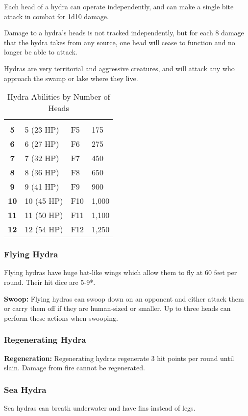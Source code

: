 \begin{multicols*}{2}
Each head of a hydra can operate independently, and can make a single bite attack in combat for 1d10 damage.

Damage to a hydra’s heads is not tracked independently, but for each 8 damage that the hydra takes from any source, one head will cease to function and no longer be able to attack.

Hydras are very territorial and aggressive creatures, and will attack any who approach the swamp or lake where they live.

\begin {table}[H]
  \caption{Hydra Abilities by Number of Heads}\label{tab:Hydra Abilities by Number of Heads}
  \begin{tabularx}{\columnwidth}{>{\bfseries}cYYY}
	 &  &  & \\
	5 & 5 (23 HP) & F5 & 175\\
	6 & 6 (27 HP) & F6 & 275\\
	7 & 7 (32 HP) & F7 & 450\\
	8 & 8 (36 HP) & F8 & 650\\
	9 & 9 (41 HP) & F9 & 900\\
	10 & 10 (45 HP) & F10 & 1,000\\
	11 & 11 (50 HP) & F11 & 1,100\\
	12 & 12 (54 HP) & F12 & 1,250
  \end {tabularx}
\end {table}

\subsubsection{Flying Hydra}
Flying hydras have huge bat-like wings which allow them to fly at 60 feet per round. Their hit dice are 5-9*.

\textbf{Swoop:} Flying hydras can swoop down on an opponent and either attack them or carry them off if they are human-sized or smaller. Up to three heads can perform these actions when swooping.

\subsubsection{Regenerating Hydra}
\textbf{Regeneration:} Regenerating hydras regenerate 3 hit points per round until slain. Damage from fire cannot be regenerated.

\subsubsection{Sea Hydra}
Sea hydras can breath underwater and have fins instead of legs.


\end{multicols*}
